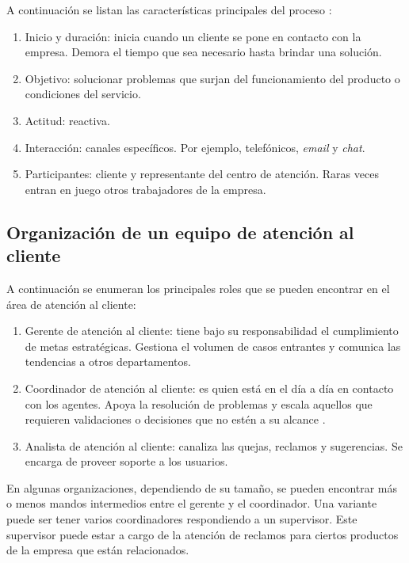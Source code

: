 A continuación se listan las características principales del proceso \citep{WEBSITE:3}:
\begin{enumerate}

\item Inicio y duración: inicia cuando un cliente se pone en contacto con la empresa. Demora el tiempo que sea necesario hasta brindar una solución.
\item Objetivo: solucionar problemas que surjan del funcionamiento del producto o condiciones del servicio.
\item Actitud: reactiva.
\item Interacción: canales específicos. Por ejemplo, telefónicos, \textit{email} y \textit{chat}.
\item Participantes: cliente y representante del centro de atención. Raras veces entran en juego otros trabajadores de la empresa.

\end{enumerate}

\subsection{Organización de un equipo de atención al cliente}

A continuación se enumeran los principales roles que se pueden encontrar en el área de atención al cliente:

\begin{enumerate}

\item Gerente de atención al cliente: tiene bajo su responsabilidad el cumplimiento de metas estratégicas. Gestiona el volumen de casos entrantes y comunica las tendencias a otros departamentos. \citep{WEBSITE:6}
\item Coordinador de atención al cliente: es quien está en el día a día en contacto con los agentes. Apoya la resolución de problemas y escala aquellos que requieren validaciones o decisiones que no estén a su alcance \citep{WEBSITE:5}.
\item Analista de atención al cliente: canaliza las quejas, reclamos y sugerencias. Se encarga de proveer soporte a los usuarios. \citep{WEBSITE:5}

\end{enumerate}

En algunas organizaciones, dependiendo de su tamaño, se pueden encontrar más o menos mandos intermedios entre el gerente y el coordinador. Una variante puede ser tener varios coordinadores respondiendo a un supervisor. Este supervisor puede estar a cargo de la atención de reclamos para ciertos productos de la empresa que están relacionados.

